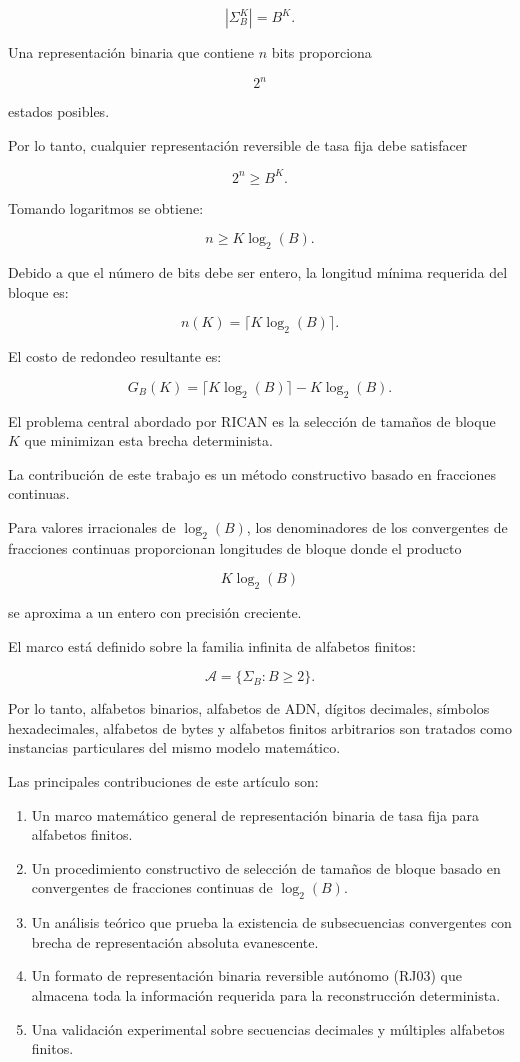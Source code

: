 \documentclass[onecolumn]{IEEEtran}
\begin{document}
\[
|\Sigma_B^K|=B^K .
\]

Una representación binaria que contiene $n$ bits proporciona

\[
2^n
\]

estados posibles.

Por lo tanto, cualquier representación reversible de tasa fija debe
satisfacer

\[
2^n\geq B^K .
\]

Tomando logaritmos se obtiene:

\[
n\geq K\log_2(B).
\]

Debido a que el número de bits debe ser entero, la longitud mínima
requerida del bloque es:

\[
n(K)=\lceil K\log_2(B)\rceil .
\]

El costo de redondeo resultante es:

\[
G_B(K)=
\lceil K\log_2(B)\rceil
-
K\log_2(B).
\]

El problema central abordado por RICAN es la selección de tamaños de
bloque $K$ que minimizan esta brecha determinista.

La contribución de este trabajo es un método constructivo basado en
fracciones continuas.

Para valores irracionales de $\log_2(B)$, los denominadores de los
convergentes de fracciones continuas proporcionan longitudes de
bloque donde el producto

\[
K\log_2(B)
\]

se aproxima a un entero con precisión creciente.

El marco está definido sobre la familia infinita de alfabetos finitos:

\[
\mathcal{A}
=
\{\Sigma_B:B\geq2\}.
\]

Por lo tanto, alfabetos binarios, alfabetos de ADN, dígitos decimales,
símbolos hexadecimales, alfabetos de bytes y alfabetos finitos
arbitrarios son tratados como instancias particulares del mismo modelo
matemático.

Las principales contribuciones de este artículo son:

\begin{enumerate}

\item Un marco matemático general de representación binaria de tasa fija
para alfabetos finitos.

\item Un procedimiento constructivo de selección de tamaños de bloque
basado en convergentes de fracciones continuas de $\log_2(B)$.

\item Un análisis teórico que prueba la existencia de subsecuencias
convergentes con brecha de representación absoluta evanescente.

\item Un formato de representación binaria reversible autónomo (RJ03)
que almacena toda la información requerida para la reconstrucción
determinista.

\item Una validación experimental sobre secuencias decimales y
múltiples alfabetos finitos.

\end{enumerate}
\end{document}
